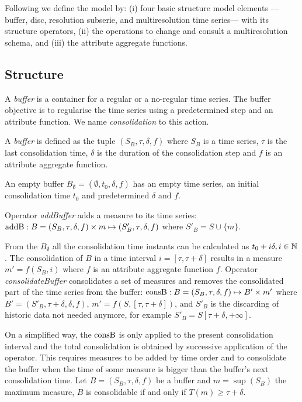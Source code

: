 Following we define the  model by: (i) four basic
structure model elements ---buffer, disc, resolution subserie, and
multiresolution time series--- with its structure operators, (ii) the
operations to change and consult a multiresolution schema, and (iii)
the attribute aggregate functions.



\subsection{Structure}

A \emph{buffer} is a container for a regular or a no-regular time
series. The buffer objective is to regularise the time series using a
predetermined step and an attribute function. We name
\emph{consolidation} to this action.
\begin{definition}%
  A \emph{buffer} is defined as the tuple $(S_B,\tau,\delta,f)$ where
  $S_B$ is a time series, $\tau$ is the last consolidation time,
  $\delta$ is the duration of the consolidation step and $f$ is an
  attribute aggregate function.

  An empty buffer $B_{\emptyset} = (\emptyset,t_0, \delta, f)$ has an
  empty time series, an initial consolidation time $t_0$ and
  predetermined $\delta$ and $f$.
\end{definition}

Operator \emph{addBuffer} adds a measure to its time series:
$\operatorname{addB}: B = (S_B,\tau,\delta,f) \times m \mapsto
(S'_B,\tau,\delta,f)$ where $S'_B = S \cup \{m\} $.

From the $B_{\emptyset}$ all the consolidation time instants can be
calculated as $t_0+i\delta, i\in\mathbb{N}$. The consolidation of $B$ in a
time interval $i=[\tau,\tau+\delta]$ results in a measure
$m'=f(S_B,i)$ where $f$ is an attribute aggregate function
$f$. Operator \emph{consolidateBuffer} consolidates a set of measures
and removes the consolidated part of the time series from the buffer:
$\operatorname{consB} : B=(S_B,\tau,\delta,f) \mapsto B' \times m'$ where $ B'=
(S'_B,\tau+\delta,\delta,f)$, $m' = f(S,[\tau,\tau+\delta])$, and
$S'_B$ is the discarding of historic data not needed anymore, for example
$S'_B = S[\tau+\delta,+\infty]$.

On a simplified way, the $\operatorname{consB}$ is only applied to the present
consolidation interval and the total consolidation is obtained by
successive application of the operator. This requires measures to be
added by time order and to consolidate the buffer when the time of
some measure is bigger than the buffer's next consolidation time.  Let
$B=(S_B,\tau,\delta,f)$ be a buffer and $m=\sup(S_B)$ the maximum
measure, $B$ is consolidable if and only if $T(m) \geq
\tau+\delta$.


